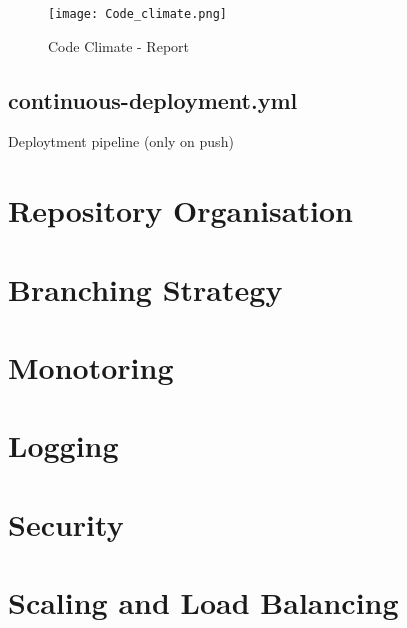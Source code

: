 \begin{figure}[H]
    \centering
    \texttt{[image: Code\_climate.png]}
    \caption{Code Climate - Report}
    \label{fig:my_label}
\end{figure}

\subsection{continuous-deployment.yml}
Deploytment pipeline (only on push)

\section{Repository Organisation}

\section{Branching Strategy}

\section{Monotoring}

\section{Logging}

\section{Security}

\section{Scaling and Load Balancing}